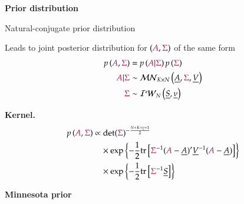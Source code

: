 \documentclass[notes,blackandwhite,mathsans,usenames,dvipsnames]{beamer}
\begin{document}
{
\begin{frame}

\begin{adjustwidth}{-0.5cm}{0cm}
\vspace{8.3cm}\Large
\textbf{{\color{mcxs1}Prior} {\color{mcxs4}distribution}}
\end{adjustwidth}

\end{frame}
}




\begin{frame}{Natural-conjugate prior distribution}

{\color{mcxs2}Leads to joint posterior distribution for} $({\color{purple}A}, {\color{purple}\Sigma})$ {\color{mcxs2}of the same form}
\begin{align*} 
p\left( {\color{purple}A}, {\color{purple}\Sigma} \right) &= p\left( {\color{purple}A}| {\color{purple}\Sigma} \right)p\left( {\color{purple}\Sigma} \right)\\
{\color{purple}A}|{\color{purple}\Sigma} &\sim \mathcal{MN}_{K\times N}\left( \underline{A},{\color{purple}\Sigma},\underline{V} \right)\\
{\color{purple}\Sigma} &\sim \mathcal{IW}_N\left( \underline{S}, \underline{\nu} \right)
\end{align*} 

\textbf{Kernel.}
\begin{align*} 
p\left( {\color{purple}A},{\color{purple}\Sigma} \right) 
&\propto \text{det}({\color{purple}\Sigma})^{-\frac{N+K+\underline{\nu}+1}{2}}\\
&\quad\times\exp\left\{ -\frac{1}{2}\text{tr}\left[ {\color{purple}\Sigma}^{-1}({\color{purple}A}-\underline{A})'\underline{V}^{-1}({\color{purple}A}-\underline{A}) \right] \right\}\\
&\quad\times \exp\left\{ -\frac{1}{2}\text{tr}\left[ {\color{purple}\Sigma}^{-1}\underline{S} \right] \right\}
\end{align*} 
\end{frame}












{
\begin{frame}

\begin{adjustwidth}{-0.5cm}{0cm}
\vspace{8.3cm}\Large
\textbf{{\color{mcxs1}Minnesota} {\color{mcxs5}prior}}
\end{adjustwidth}

\end{frame}
}
\end{document}
